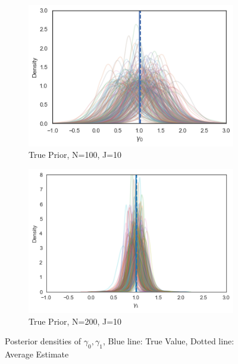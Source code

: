 \begin{figure}[H]
  \centering
  \begin{subfigure}[b]{0.4\linewidth}
    \includegraphics[width=\linewidth]{graphics/posterior_plot_gamma0}
    \caption{True Prior, N=100, J=10}
  \end{subfigure}
  \begin{subfigure}[b]{0.4\linewidth}
    \includegraphics[width=\linewidth]{graphics/posterior_plot_gamma1}
    \caption{True Prior, N=200, J=10}
  \end{subfigure}
  \caption{Posterior densities  of $\gamma_0, \gamma_1$, Blue line: True Value, Dotted line: Average Estimate}
  \label{fig: gamma0 and gamma1}
\end{figure}


